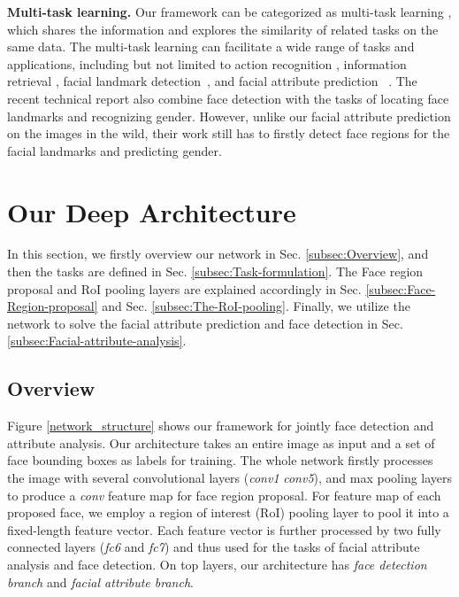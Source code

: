 \documentclass[10pt,twocolumn,letterpaper]{article}
\begin{document}
\vspace{0.05in}

\noindent \textbf{Multi-task learning.} Our framework can be categorized
as multi-task learning \cite{yosinski2014transferable,pan2010survey},
which shares the information and explores the similarity of related
tasks on the same data. The multi-task learning can facilitate a wide
range of tasks and applications, including but not limited to action
recognition \cite{zhou2013learning}, information retrieval \cite{liu2015representation},
facial landmark detection~\cite{zhang2014facial,ranjan2016hyperface},
and facial attribute prediction ~\cite{moon_attrb,ehrlich2016facial,abdulnabi2015multi,all_in_one,lu2016fully}.
The recent technical report \cite{ranjan2016hyperface} also combine
face detection with the tasks of locating face landmarks and recognizing
gender. However, unlike our facial attribute prediction on the images
in the wild, their work still has to firstly detect face regions for
the facial landmarks and predicting gender. 

\section{Our Deep Architecture }

In this section, we firstly overview our network in Sec. \ref{subsec:Overview},
and then the tasks are defined in Sec. \ref{subsec:Task-formulation}.
The Face region proposal and RoI pooling layers are explained accordingly
in Sec. \ref{subsec:Face-Region-proposal} and Sec. \ref{subsec:The-RoI-pooling}.
Finally, we utilize the network to solve the facial attribute prediction
and face detection in Sec. \ref{subsec:Facial-attribute-analysis}. 

\subsection{Overview\label{subsec:Overview}}

Figure \ref{network_structure} shows our framework for jointly face
detection and attribute analysis. Our architecture takes an entire
image as input and a set of face bounding boxes as labels for training. The whole
network firstly processes the image with several convolutional layers
(\emph{conv1}\textendash{} \emph{conv5}), and max pooling layers to
produce a \emph{conv} feature map for face region proposal. For feature
map of each proposed face, we employ a region of interest (RoI) pooling
layer to pool it into a fixed-length feature vector. Each feature
vector is further processed by two fully connected layers (\emph{fc6}
and \emph{fc7}) and thus used for the tasks of facial attribute analysis
and face detection. On top layers, our architecture has \emph{face
detection branch} and \emph{facial attribute branch}. 
\end{document}
